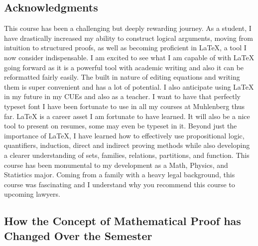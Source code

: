 \documentclass{article}
\begin{document}
\subsection*{Acknowledgments}
\begin{center}
\justifying
This course has been a challenging but deeply rewarding journey. As a student, I have drastically increased my ability to construct logical arguments, moving from intuition to structured proofs, as well as becoming proficient in LaTeX, a tool I now consider indispensable. I am excited to see what I am capable of with LaTeX going forward as it is a powerful tool with academic writing and also it can be reformatted fairly easily. The built in nature of editing equations and writing them is super convenient and has a lot of potential. I also anticipate using LaTeX in my future in my CUEs and also as a teacher. I want to have that perfectly typeset font I have been fortunate to use in all my courses at Muhlenberg thus far. LaTeX is a career asset I am fortunate to have learned. It will also be a nice tool to present on resumes, some may even be typeset in it. Beyond just the importance of LaTeX, I have learned how to effectively use propositional logic, quantifiers, induction, direct and indirect proving methods while also developing a clearer understanding of sets, families, relations, partitions, and function. This course has been monumental to my development as a Math, Physics, and Statistics major. Coming from a family with a heavy legal background, this course was fascinating and I understand why you recommend this course to upcoming lawyers.

\end{center}

\subsection*{How the Concept of Mathematical Proof has Changed Over the Semester}
\end{document}
